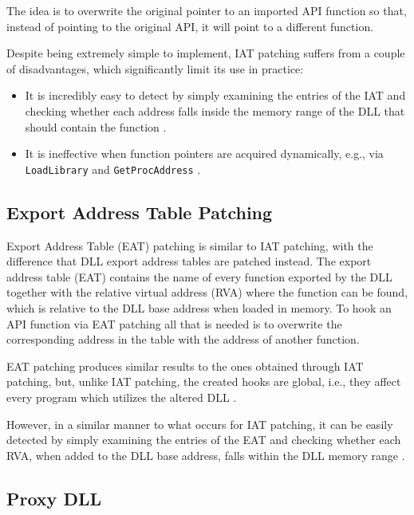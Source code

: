 The idea is to overwrite the original pointer to an imported API function so that, instead of pointing to the original API, it will point to a different function.

\newpage

Despite being extremely simple to implement, IAT patching suffers from a couple of disadvantages, which significantly limit its use in practice:
\begin{itemize}
    \item It is incredibly easy to detect by simply examining the entries of the IAT and checking whether each address falls inside the memory range of the DLL that should contain the function \cite{HookingDetection}.
    \item It is ineffective when function pointers are acquired dynamically, e.g., via \texttt{LoadLibrary} and \texttt{GetProcAddress} \cite{Buescher:2011:BIS:2186328.2186347}.
\end{itemize}

\subsection{Export Address Table Patching}

Export Address Table (EAT) patching is similar to IAT patching, with the difference that DLL export address tables are patched instead. The export address table (EAT) contains the name of every function exported by the DLL together with the relative virtual address (RVA) where the function can be found, which is relative to the DLL base address when loaded in memory. To hook an API function via EAT patching all that is needed is to overwrite the corresponding address in the table with the address of another function.

EAT patching produces similar results to the ones obtained through IAT patching, but, unlike IAT patching, the created hooks are global, i.e., they affect every program which utilizes the altered DLL \cite{Berdajs:2010:EAU:1815744.1815746}.

However, in a similar manner to what occurs for IAT patching, it can be easily detected by simply examining the entries of the EAT and checking whether each RVA, when added to the DLL base address, falls within the DLL memory range \cite{Stuttard:2014:ADC:2616217}.

\subsection{Proxy DLL}

